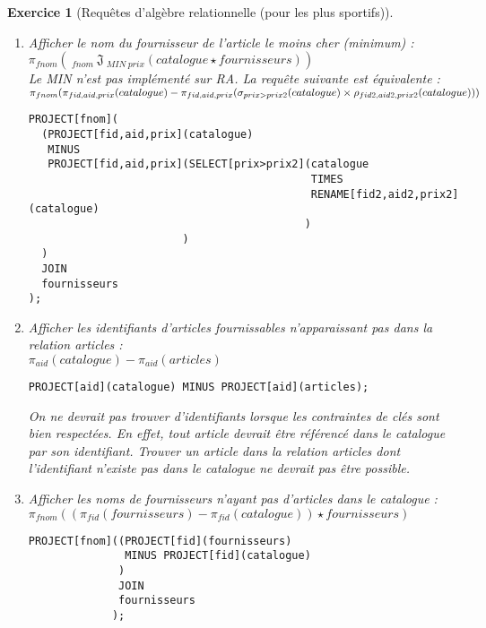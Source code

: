\documentclass{article}
\theoremstyle{exostyle}
\newtheorem{exercice}{Exercice}
\newenvironment{questions}{

\begin{enumerate}[\hspace{12pt}\bfseries\itshape 1.]}{
\end{enumerate}

} %
\begin{document}
\begin{exercice}[Requêtes d'algèbre relationnelle (pour les plus sportifs)]
\begin{questions}
\item Afficher le nom du fournisseur de l'article le moins cher (minimum) :\\
$\pi_{fnom}(\ _{fnom}\ \mathfrak{J}\ _{MIN\ prix}(catalogue \star fournisseurs))$\\
Le MIN n'est pas implémenté sur RA. La requête suivante est équivalente :\\
$\pi_{fnom}(\pi_{fid,aid,prix}(catalogue)
-\newline
\pi_{fid,aid,prix}(\sigma_{prix>prix2}(catalogue) \times \rho_{fid2,aid2,prix2}(catalogue)))$
\begin{verbatim}
PROJECT[fnom](
  (PROJECT[fid,aid,prix](catalogue)
   MINUS
   PROJECT[fid,aid,prix](SELECT[prix>prix2](catalogue
                                            TIMES
                                            RENAME[fid2,aid2,prix2](catalogue)
                                           )
                        )
  )
  JOIN
  fournisseurs
);
\end{verbatim}

\item Afficher les identifiants d'articles fournissables n'apparaissant pas dans la relation articles :\\
$\pi_{aid}(catalogue) -\pi_{aid}(articles)$
\begin{verbatim}
PROJECT[aid](catalogue) MINUS PROJECT[aid](articles);
\end{verbatim}
On ne devrait pas trouver d'identifiants lorsque les contraintes de
clés sont bien respectées. En effet, tout article devrait être
référencé dans le catalogue par son identifiant. Trouver un article
dans la relation articles dont l'identifiant n'existe pas dans le
catalogue ne devrait pas être possible.

\item Afficher les noms de fournisseurs n'ayant pas d'articles dans le catalogue :\\
$\pi_{fnom}((\pi_{fid}(fournisseurs) -\pi_{fid}(catalogue)) \star fournisseurs)$
\begin{verbatim}
PROJECT[fnom]((PROJECT[fid](fournisseurs)
               MINUS PROJECT[fid](catalogue)
              )
              JOIN
              fournisseurs
             );
\end{verbatim}


\end{questions}
\end{exercice}
\end{document}
